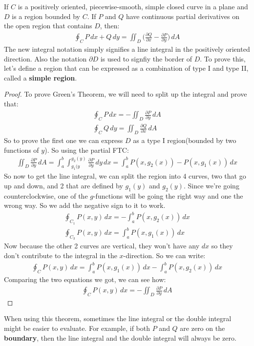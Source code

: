 \documentclass{article}
\newcommand{\p}{\partial}
\begin{document}
If $C$ is a positively oriented, piecewise-smooth, simple closed curve in a plane and $D$ is a region bounded by $C$. If $P$ and $Q$ have continuous partial derivatives on the open region that contains $D$, then:
\begin{gather*}
    \oint_C P\,dx + Q\,dy = \iint_D \bigg(\frac{\p Q}{\p x} - \frac{\p P}{\p y}\bigg)\,dA
\end{gather*}
The new integral notation simply signifies a line integral in the positively oriented direction. Also the notation $\p D$ is used to signfiy the border of $D$. To prove this, let's define a region that can be expressed as a combination of type I and type II, called a \textbf{simple region}.
\begin{proof}
To prove Green's Theorem, we will need to split up the integral and prove that:
\begin{gather*}
    \oint_C P\,dx = -\iint_D \frac{\p P}{\p y}\,dA\\
    \oint_C Q\,dy = \iint_D \frac{\p Q}{\p x}\,dA
\end{gather*}
So to prove the first one we can express $D$ as a type I region(bounded by two functions of $y$). So using the partial FTC:
\begin{gather*}
    \iint_D \frac{\p P}{\p y}\,dA = \int_a^b\int_{g_1(y}^{g_2(y)}\frac{\p P}{\p y}\,dy\,dx = \int_a^b P(x,g_2(x)) - P(x,g_1(x))\,dx
\end{gather*}
So now to get the line integral, we can split the region into 4 curves, two that go up and down, and 2 that are defined by $g_1(y)$ and $g_2(y)$. Since we're going counterclockwise, one of the $g$-functions will be going the right way and one the wrong way. So we add the negative sign to it to work.
\begin{gather*}
    \oint_{C_1}P(x,y)\,dx = -\int_a^b P(x,g_2(x))\,dx\\
    \oint_{C_3}P(x,y)\,dx = \int_a^b P(x,g_1(x))\,dx
\end{gather*}
Now because the other 2 curves are vertical, they won't have any $dx$ so they don't contribute to the integral in the $x$-direction. So we can write:
\begin{gather*}
    \oint_C P(x,y)\,dx = \int_a^b P(x,g_1(x))\,dx - \int_a^b P(x,g_2(x))\,dx
\end{gather*}
Comparing the two equations we got, we can see how:
\begin{gather*}
    \oint_C P(x,y)\,dx = -\iint_D \frac{\p P}{\p y}\,dA
\end{gather*}
\end{proof}
When using this theorem, sometimes the line integral or the double integral might be easier to evaluate. For example, if both $P$ and $Q$ are zero on the \textbf{boundary}, then the line integral and the double integral will always be zero.
\end{document}
